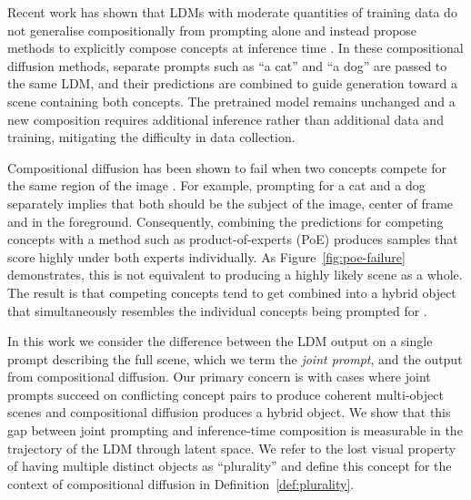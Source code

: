 \documentclass{article} %
\begin{document}
Recent work \citep{du2023reduce, huang2025t2icompbench} has shown that LDMs with moderate quantities of training data do not generalise compositionally from prompting alone and instead propose methods to explicitly compose concepts at inference time \citep{liu2022compositional, du2023reduce, skreta2024superdiff, zhang2025product}. %
In these compositional diffusion methods, separate prompts such as “a cat” and “a dog” are passed to the same LDM, and their predictions are combined to guide generation toward a scene containing both concepts. The pretrained model remains unchanged and a new composition requires additional inference rather than additional data and training, mitigating the difficulty in data collection.

Compositional diffusion has been shown to fail when two concepts compete for the same region of the image \citep{bradley2025mechanisms}. For example, prompting for a cat and a dog separately implies that both should be the subject of the image, center of frame and in the foreground. Consequently, combining the predictions for competing concepts with a method such as product-of-experts (PoE) \citep{liu2022compositional, zhang2025product} produces samples that score highly under both experts individually. As Figure~\ref{fig:poe-failure} demonstrates, this is not equivalent to producing a highly likely scene as a whole. The result is that competing concepts tend to get combined into a hybrid object that simultaneously resembles the individual concepts being prompted for \citep{dutta2026steer}. 

In this work we consider the difference between the LDM output on a single prompt describing the full scene, which we term the \textit{joint prompt}, and the output from compositional diffusion. Our primary concern is with cases where joint prompts succeed on conflicting concept pairs to produce coherent multi-object scenes and compositional diffusion produces a hybrid object. We show that this gap between joint prompting and inference-time composition is measurable in the trajectory of the LDM through latent space. We refer to the lost visual property of having multiple distinct objects as ``plurality'' and define this concept for the context of compositional diffusion in Definition~\ref{def:plurality}.
\end{document}
